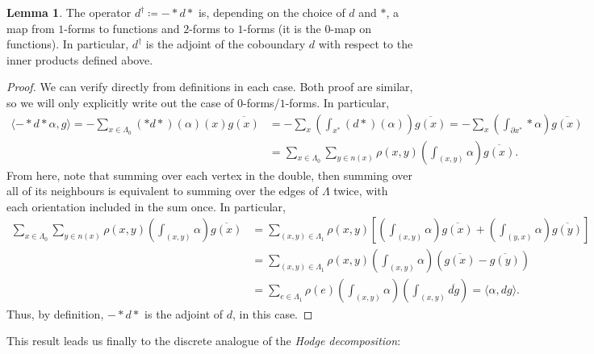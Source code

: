 \documentclass[aps,pra,showpacs,notitlepage,onecolumn,superscriptaddress,nofootinbib]{revtex4-1}
\theoremstyle{definition}
\newtheorem{lemma}{Lemma}[section]
\begin{document}
\begin{lemma}
  The operator $d^{\dagger} \coloneqq - * d *$ is, depending on the choice of $d$ and $*$, a map from $1$-forms to functions and $2$-forms to $1$-forms (it is the $0$-map on functions).
  In particular, $d^{\dagger}$ is the adjoint of the coboundary $d$ with respect to the inner products defined above.
\end{lemma}
\begin{proof}
  We can verify directly from definitions in each case. Both proof are similar, so we will only explicitly write out the case of $0$-forms/$1$-forms. In particular,
  \begin{align}
    \langle - * d * \alpha, g \rangle = -\displaystyle\sum_{x \in \Lambda_0} (* d *)(\alpha)(x) \overline{g(x)} &= -\displaystyle\sum_{x} \left( \displaystyle\int_{x^{*}} (d *)(\alpha) \right) \overline{g(x)} =
    -\displaystyle\sum_{x} \left( \displaystyle\int_{\partial x^{*}} * \alpha \right) \overline{g(x)} \\ &= \displaystyle\sum_{x \in \Lambda_0} \displaystyle\sum_{y \in n(x)} \rho(x, y) \left( \displaystyle\int_{(x, y)} \alpha \right) \overline{g(x)}.
  \end{align}
  From here, note that summing over each vertex in the double, then summing over all of its neighbours is equivalent to summing over the edges of $\Lambda$ twice, with each orientation included in the sum once. In particular,
  \begin{align}
    \displaystyle\sum_{x \in \Lambda_0} \displaystyle\sum_{y \in n(x)} \rho(x, y) \left( \displaystyle\int_{(x, y)} \alpha \right) \overline{g(x)} &= \displaystyle\sum_{(x, y) \in \Lambda_1} \rho(x, y) \left[  \left( \displaystyle\int_{(x, y)} \alpha \right) \overline{g(x)} + \left( \displaystyle\int_{(y, x)} \alpha \right) \overline{g(y)} \right]
    \\ & = \displaystyle\sum_{(x, y) \in \Lambda_1} \rho(x, y) \left( \displaystyle\int_{(x, y)} \alpha \right) \left( \overline{g(x)} - \overline{g(y)} \right)
    \\ & = \displaystyle\sum_{e \in \Lambda_1} \rho(e)  \left( \displaystyle\int_{(x, y)} \alpha \right) \left( \displaystyle\int_{(x, y)} \overline{dg} \right) = \langle \alpha, dg \rangle.
  \end{align}
  Thus, by definition, $- * d *$ is the adjoint of $d$, in this case.
\end{proof}

\noindent This result leads us finally to the discrete analogue of the \emph{Hodge decomposition}:
\end{document}
